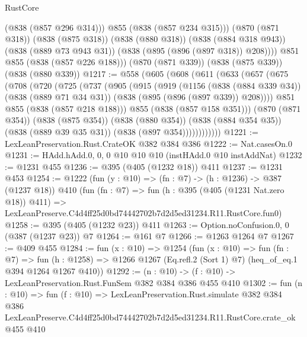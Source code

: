 \begin{lexlean}{RustCore}
\begin{coremodule}
              (@838 (@857 @296 @314)))
            @855
            (@838 (@857 @234 @315)))
          (@870 (@871 @318))
          (@838 (@875 @318))
          (@838 (@880 @318))
          (@838 (@884 @318 @943))
          (@838 (@889 @73 @943 @31))
          (@838 (@895 (@896 (@897 @318)) @208))))
      @851
      @855
      (@838 (@857 @226 @188)))
    (@870 (@871 @339))
    (@838 (@875 @339))
    (@838 (@880 @339))
@1217 := @558
    (@605
      (@608
        (@611
          (@633
            (@657
              (@675
                (@708
                  (@720
                    (@725
                      (@737
                        (@905
                          (@915
                            (@919
                              (@1156
                                (@838 (@884 @339 @34))
                                (@838 (@889 @71 @34 @31))
                                (@838 (@895 (@896 (@897 @339)) @208))))
                            @851
                            @855
                            (@838 (@857 @218 @188)))
                          @855
                          (@838 (@857 @158 @351)))
                        (@870 (@871 @354))
                        (@838 (@875 @354))
                        (@838 (@880 @354))
                        (@838 (@884 @354 @35))
                        (@838 (@889 @39 @35 @31))
                        (@838 (@897 @354))))))))))))
@1221 := LexLeanPreservation.Rust.CrateOK @382 @384 @386
@1222 := Nat.casesOn.{0}
@1231 := HAdd.hAdd.{0, 0, 0} @10 @10 @10 (instHAdd.{0} @10 instAddNat)
@1232 := @1231 @455
@1236 := @395 (@405 (@1232 @18)) @411
@1237 := @1231 @453
@1254 := @1222
    (fun (y : @10) => (fn : @7) -> (h : @1236) -> @387 (@1237 @18))
    @410
    (fun (fn : @7) =>
    fun (h : @395 (@405 (@1231 Nat.zero @18)) @411) =>
    LexLeanPreserve.C4d4ff25d0bd74442702b7d2d5ed31234.R11.RustCore.fun0)
@1258 := @395 (@405 (@1232 @23)) @411
@1263 := Option.noConfusion.{0, 0} (@387 (@1237 @23)) @7
@1264 := @161 @7
@1266 := @1263 @1264 @7
@1267 := @409 @455
@1284 := fun (x : @10) =>
  @1254
    (fun (x : @10) =>
    fun (fn : @7) =>
    fun (h : @1258) => @1266 @1267 (Eq.refl.{2} (Sort 1) @7) (heq_of_eq.{1} @394 @1264 @1267 @410))
@1292 := (n : @10) -> (f : @10) -> LexLeanPreservation.Rust.FunSem @382 @384 @386 @455 @410
@1302 := fun (n : @10) =>
  fun (f : @10) =>
  LexLeanPreservation.Rust.simulate
    @382
    @384
    @386
    LexLeanPreserve.C4d4ff25d0bd74442702b7d2d5ed31234.R11.RustCore.crate_ok
    @455
    @410
\end{coremodule}
\end{lexlean}

